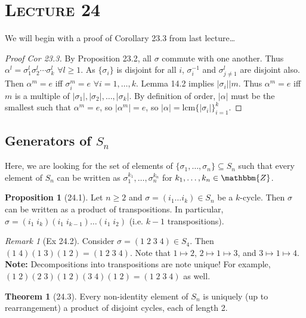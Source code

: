 \documentclass{article}
\newcommand{\Z}{\mathbbm{Z}}
\newcommand{\inverse}[1]{#1^{-1}}
\newcommand{\lcm}{\mathrm{lcm}}
\renewcommand{\Subset}{\subseteq}
\theoremstyle{definition}
\newtheorem*{thm}{Theorem}
\newtheorem*{prop}{Proposition}
\theoremstyle{remark}
\newtheorem*{rmk}{Remark}
\begin{document}
    \section*{\textbf{\textsc{Lecture 24}}}{
        We will begin with a proof of Corollary 23.3 from last lecture\ldots
        \begin{proof}[Proof Cor 23.3]
            By Proposition 23.2, all $\sigma$ commute with one another. Thus $\alpha^l=\sigma_1^l\sigma_2^l\cdots\sigma_k^l$ $\forall l\geq 1$. As $\{\sigma_i\}$ is disjoint for all $i$, $\inverse{\sigma_i}$ and $\sigma_{j\neq1}^l$ are disjoint also. Then $\alpha^m=e$ iff $\sigma_i^m=e$ $\forall i=1,\ldots,k$. Lemma 14.2 implies $|\sigma_i|\big|m$. Thus $\alpha^m=e$ iff $m$ is a multiple of $|\sigma_1|,|\sigma_2|,\ldots,|\sigma_k|$. By definition of order, $|\alpha|$ must be the smallest such that $\alpha^m=e$, so $|\alpha^m|=e$, so $|\alpha|=\lcm\{|\sigma_i|\}_{i=1}^k$.
        \end{proof}
        
        \subsection*{Generators of $S_n$}{
            Here, we are looking for the set of elements of $\{\sigma_1,\ldots,\sigma_n\}\Subset S_n$ such that every element of $S_n$ can be written as $\sigma_1^{k_1},\ldots,\sigma_n^{k_n}$ for $k_1,\ldots,k_n \in \Z$.
        
            \begin{prop}[24.1]
                Let $n\geq 2$ and $\sigma=(i_1\ldots i_k)\in S_n$ be a $k$-cycle. Then $\sigma$ can be written as a product of transpositions. In particular, $\sigma=(i_1\;i_k)(i_1\;i_{k-1})\ldots(i_1\;i_2)$ (i.e. $k-1$ transpositions).
            \end{prop}
            
            \begin{rmk}[Ex 24.2]
                Consider $\sigma=(1\;2\;3\;4)\in S_4$. Then $(1\;4)(1\;3)(1\;2)=(1\;2\;3\;4)$. Note that $1\mapsto2$, $2\mapsto1\mapsto3$, and $3\mapsto1\mapsto4$.\\
                \textbf{Note:} Decompositions into transpositions are note unique! For example, $(1\;2)(2\;3)(1\;2)(3\;4)(1\;2)=(1\;2\;3\;4)$ as well.
            \end{rmk}
            
            \begin{thm}[24.3]
                Every non-identity element of $S_n$ is uniquely (up to rearrangement) a product of disjoint cycles, each of length 2.
            \end{thm}
            
}}
\end{document}
